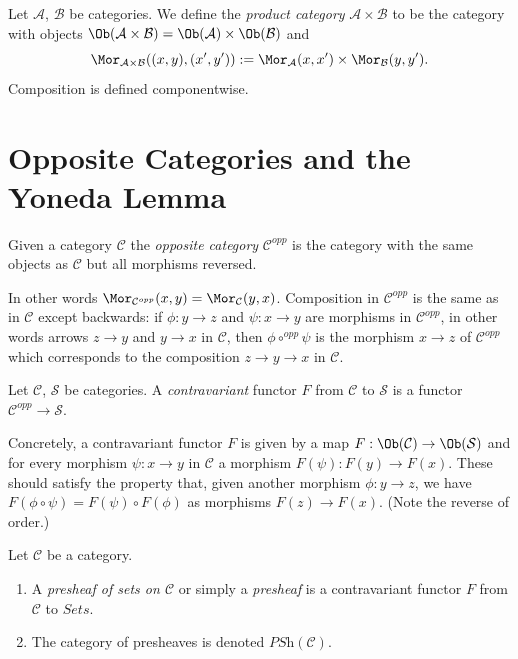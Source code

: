 \begin{definition}
\label{definition-product-category}
Let $\mathcal{A}$, $\mathcal{B}$ be categories.
We define the {\it product category}
$\mathcal{A} \times \mathcal{B}$ to be the category with
objects
$\Ob(\mathcal{A} \times \mathcal{B}) =
\Ob(\mathcal{A}) \times \Ob(\mathcal{B})$
and
$$
\Mor_{\mathcal{A} \times \mathcal{B}}((x, y), (x', y'))
:=
\Mor_\mathcal{A}(x, x')\times
\Mor_\mathcal{B}(y, y').
$$
Composition is defined componentwise.
\end{definition}


\section{Opposite Categories and the Yoneda Lemma}
\label{section-opposite}

\begin{definition}
\label{definition-opposite}
Given a category $\mathcal{C}$ the {\it opposite category}
$\mathcal{C}^{opp}$ is the category with the same objects
as $\mathcal{C}$ but all morphisms reversed.
\end{definition}

\noindent
In other words
$\Mor_{\mathcal{C}^{opp}}(x, y) = \Mor_\mathcal{C}(y, x)$.
Composition in $\mathcal{C}^{opp}$ is the same as in $\mathcal{C}$
except backwards: if $\phi : y \to z$ and $\psi : x \to y$
are morphisms in $\mathcal{C}^{opp}$, in other words arrows
$z \to y$ and $y \to x$ in $\mathcal{C}$,
then $\phi \circ^{opp} \psi$ is the morphism $x \to z$
of $\mathcal{C}^{opp}$ which corresponds to the composition
$z \to y \to x$ in $\mathcal{C}$.

\begin{definition}
\label{definition-contravariant}
Let $\mathcal{C}$, $\mathcal{S}$ be categories.
A {\it contravariant} functor $F$
from $\mathcal{C}$ to $\mathcal{S}$
is a functor $\mathcal{C}^{opp}\to \mathcal{S}$.
\end{definition}

\noindent
Concretely, a contravariant functor $F$ is given
by a map $F : \Ob(\mathcal{C}) \to
\Ob(\mathcal{S})$ and for every morphism
$\psi : x \to y$ in $\mathcal{C}$ a morphism
$F(\psi) : F(y) \to F(x)$. These should satisfy the property
that, given another morphism
$\phi : y \to z$, we have $F(\phi \circ \psi)
= F(\psi) \circ F(\phi)$ as morphisms $F(z) \to F(x)$.
(Note the reverse of order.)

\begin{definition}
\label{definition-presheaf}
Let $\mathcal{C}$ be a category.
\begin{enumerate}
\item A {\it presheaf of sets on $\mathcal{C}$}
or simply a {\it presheaf} is a contravariant functor
$F$ from $\mathcal{C}$ to $\textit{Sets}$.
\item The category of presheaves is denoted $\textit{PSh}(\mathcal{C})$.
\end{enumerate}
\end{definition}


